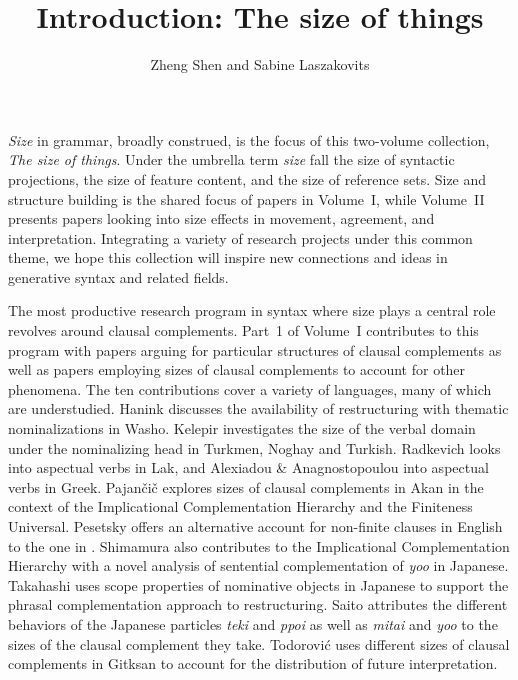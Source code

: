 \documentclass[output=paper]{langscibook}
\author{Zheng Shen\affiliation{National University of Singapore} and Sabine Laszakovits\affiliation{Austrian Academy of Sciences; University of Connecticut}}
\title{Introduction: The size of things}
\begin{document}
\maketitle

\noindent\textit{Size} in grammar, broadly construed, is the focus of this two-volume collection, \textit{The size of things}.
Under the umbrella term \textit{size} fall the size of syntactic projections, the size of feature content, and the size of  reference sets. 
Size and structure building is the shared focus of papers in Volume~I, while Volume~II presents papers looking into size effects in movement, agreement, and interpretation. 
Integrating a variety of research projects under this common theme, we hope this collection will inspire new connections and ideas in generative syntax and related fields. 

The most productive research program in syntax where size plays a central role revolves around clausal complements. 
Part~1 of Volume~I contributes to this program with papers arguing for particular structures of clausal complements as well as papers employing sizes of clausal complements to account for other phenomena. 
The ten contributions cover a variety of languages, many of which are understudied. 
Hanink discusses the availability of restructuring with thematic nominalizations in Washo. 
Kelepir investigates the size of the verbal domain under the nominalizing head in Turkmen, Noghay and Turkish. 
Radkevich looks into aspectual verbs in Lak, and Alexiadou \& Anagnostopoulou into aspectual verbs in Greek.
Pajančič explores sizes of clausal complements in Akan in the context of the Implicational Complementation Hierarchy and the Finiteness Universal. 
Pesetsky offers an alternative account for non-finite clauses in English to the one in \citet{Wurmbrand:2014}.
Shimamura also contributes to the Implicational Complementation Hierarchy with a novel analysis of sentential complementation of \textit{yoo} in Japanese. 
Takahashi uses scope properties of nominative objects in Japanese to support the phrasal complementation approach to restructuring. 
Saito attributes the different behaviors of the Japanese particles \textit{teki} and \textit{ppoi} as well as \textit{mitai} and \textit{yoo} to the sizes of the clausal complement they take.
Todorović uses different sizes of clausal complements in Gitksan to account for the distribution of future interpretation. 
\end{document}
